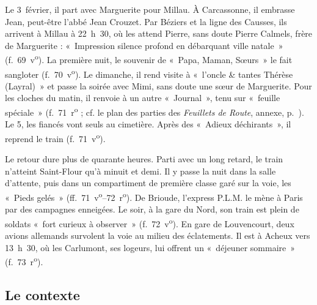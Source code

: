 Le 3~février, il part avec Marguerite pour Millau. À Carcassonne, il embrasse Jean, peut-être l'abbé Jean Crouzet. Par Béziers et la ligne des Causses, ils arrivent à Millau à 22~h~30, où les attend Pierre, sans doute Pierre Calmels, frère de Marguerite : «~Impression silence profond en débarquant ville natale~» (f.~69~v\textsuperscript{o}). La première nuit, le souvenir de «~Papa, Maman, Sœurs~» le fait sangloter (f.~70~v\textsuperscript{o}). Le dimanche, il rend visite à «~l'oncle \& tantes Thérèse (Layral)~» et passe la soirée avec Mimi, sans doute une sœur de Marguerite. Pour les cloches du matin, il renvoie à un autre «~Journal~», tenu sur «~feuille spéciale~» (f.~71~r\textsuperscript{o} ; cf. le plan des parties des \textit{Feuillets de Route}, annexe, p.~\pageref{annexe:doc6-plan}). Le 5, les fiancés vont seuls au cimetière. Après des «~Adieux déchirants~», il reprend le train (f.~71~v\textsuperscript{o}).

Le retour dure plus de quarante heures. Parti avec un long retard, le train n'atteint Saint-Flour qu'à minuit et demi. Il y passe la nuit dans la salle d'attente, puis dans un compartiment de première classe garé sur la voie, les «~Pieds gelés~» (ff.~71~v\textsuperscript{o}--72~r\textsuperscript{o}). De Brioude, l'express P.L.M. le mène à Paris par des campagnes enneigées. Le soir, à la gare du Nord, son train est plein de soldats «~fort curieux à observer~» (f.~72~v\textsuperscript{o}). En gare de Louvencourt, deux avions allemands survolent la voie au milieu des éclatements. Il est à Acheux vers 13~h~30, où les Carlumont, ses logeurs, lui offrent un «~déjeuner sommaire~» (f.~73~r\textsuperscript{o}).

\subsection*{Le contexte}

